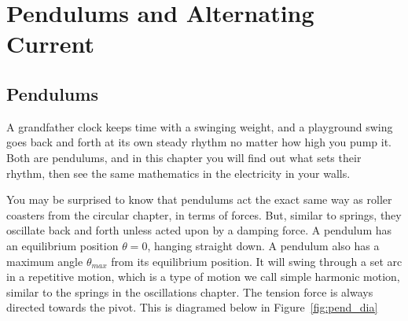 \chapter{Pendulums and Alternating Current}

\section{Pendulums}

A grandfather clock keeps time with a swinging weight, and a playground
swing goes back and forth at its own steady rhythm no matter how high you
pump it. Both are pendulums, and in this chapter you will find out what
sets their rhythm, then see the same mathematics in the electricity in your
walls.

You may be surprised to know that pendulums act the exact same way as roller coasters from the circular chapter, in terms of forces. But, similar to springs,
they oscillate back and forth unless acted upon by a damping force. A pendulum has
an equilibrium position $\theta=0$, hanging straight down. A pendulum also has a maximum angle $\theta_{max}$ from its equilibrium position. It will swing through a set arc in a repetitive motion, which is a
type of motion we call simple harmonic motion, similar to the springs in the oscillations chapter. The tension force is always directed towards the pivot. This is
diagramed below in Figure~\ref{fig:pend_dia}
